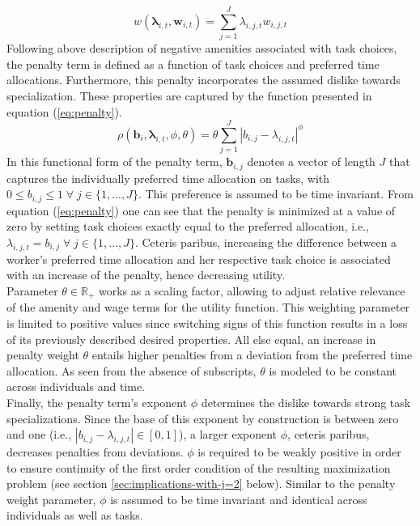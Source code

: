 \documentclass[../main.tex]{subfiles}
\begin{document}
\begin{equation}\label{eq:real_wage}
	w(\boldsymbol{\lambda}_{i,t}, \boldsymbol{w}_{i,t}) = \sum^J_{j=1} \lambda_{i,j,t} w_{i,j,t}
\end{equation}
Following above description of negative amenities associated with task choices, the penalty term is defined as a function of task choices and preferred time allocations. Furthermore, this penalty incorporates the assumed dislike towards specialization. These properties are captured by the function presented in equation (\ref{eq:penalty}).
\begin{equation}\label{eq:penalty}
	\rho(\boldsymbol{b}_i, \boldsymbol{\lambda}_{i,t}, \phi, \theta) = \theta \sum^J_{j=1} |b_{i,j} - \lambda_{i,j,t}|^\phi
\end{equation}
In this functional form of the penalty term, $\boldsymbol{b}_{i,j}$ denotes a vector of length $J$ that captures the individually preferred time allocation on tasks, with $0 \leq b_{i,j} \leq 1 \;  \forall \; j \in \{1, ..., J\}$. This preference is assumed to be time invariant. From equation (\ref{eq:penalty}) one can see that the penalty is minimized at a value of zero by setting task choices exactly equal to the preferred allocation, i.e., $\lambda_{i,j,t} = b_{i,j} \; \forall \; j \in \{1, ..., J\}$. Ceteris paribus, increasing the difference between a worker's preferred time allocation and her respective task choice is associated with an increase of the penalty, hence decreasing utility.
\\
Parameter $\theta \in \mathbb{R}_+$ works as a scaling factor, allowing to adjust relative relevance of the amenity and wage terms for the utility function. This weighting parameter is limited to positive values since switching signs of this function results in a loss of its previously described desired properties. All else equal, an increase in penalty weight $\theta$ entails higher penalties from a deviation from the preferred time allocation. As seen from the absence of subscripts, $\theta$ is modeled to be constant across individuals and time. 
\\
Finally, the penalty term's exponent $\phi$ determines the dislike towards strong task specializations. Since the base of this exponent by construction is between zero and one (i.e., $|b_{i,j} - \lambda_{i,j,t}| \in [0,1]$), a larger exponent $\phi$, ceteris paribus, decreases penalties from deviations. $\phi$ is required to be weakly positive in order to ensure continuity of the first order condition of the resulting maximization problem (see section \ref{sec:implications-with-j=2} below). Similar to the penalty weight parameter, $\phi$ is assumed to be time invariant and identical across individuals as well as tasks.
\end{document}
